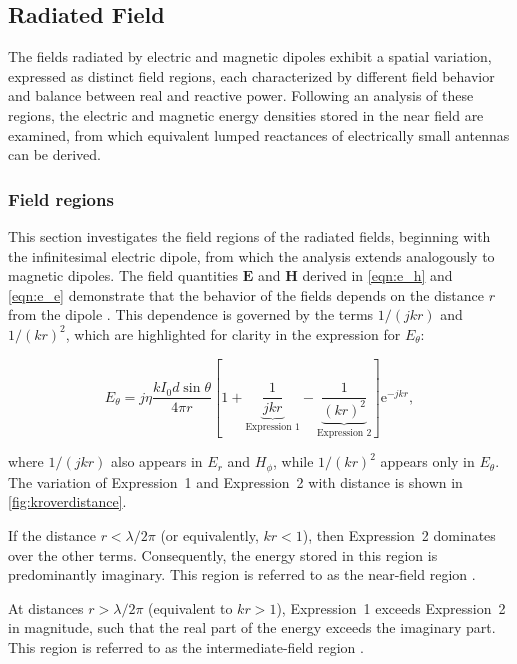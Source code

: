 \subsection{Radiated Field}\label{sec:rad_fields}

The fields radiated by electric and magnetic dipoles exhibit a spatial variation,
expressed as distinct field regions, each characterized by different field behavior and balance between real and reactive power. Following an analysis of these regions,
the electric and magnetic energy densities stored in the near field are examined,
from which equivalent lumped reactances of electrically small antennas can be
derived.

\FloatBarrier
\subsubsection{Field regions}

This section investigates the field regions of the radiated fields, beginning with the infinitesimal electric dipole, from which the analysis extends analogously to magnetic dipoles. The field quantities $\mathbf{E}$ and $\mathbf{H}$ derived in \eqref{eqn:e_h} and \eqref{eqn:e_e} demonstrate that the behavior of the fields depends on the distance $r$ from the dipole \cite[p.~156]{Balanis_1997}. This dependence is governed by the terms $1/(jkr)$ and $1/(kr)^2$, which are highlighted for clarity in the expression for $E_\theta$: 

\begin{equation}
	E_\theta = j\eta \frac{kI_0 d \sin \theta }{4\pi r}\left[ 1 + \underbrace{\frac{1}{jkr}}_{\text{Expression 1}} - \underbrace{\frac{1}{(kr)^2}}_{\text{Expression 2}} \right] \mathrm{e}^{-jkr},
	\label{eqn:e_et_2}
\end{equation}

where $1/(jkr)$ also appears in $E_r$ and $H_\phi$, while $1/(kr)^2$ appears only 
in $E_\theta$. The variation of Expression~1 and Expression~2 with distance is shown in \autoref{fig:kroverdistance}.

If the distance $r < \lambda/2\pi$ (or equivalently, $kr < 1$), then Expression~2 dominates over the other terms. Consequently, the energy stored in this region is predominantly imaginary. This region is referred to as the near-field region \cite[pp.~156-157]{Balanis_1997}.

At distances $r > \lambda / 2\pi$ (equivalent to $kr > 1$), Expression~1 exceeds Expression~2 in magnitude, such that the real part of the energy exceeds the imaginary part. This region is referred to as the intermediate-field region \cite[p.~157]{Balanis_1997}. 

